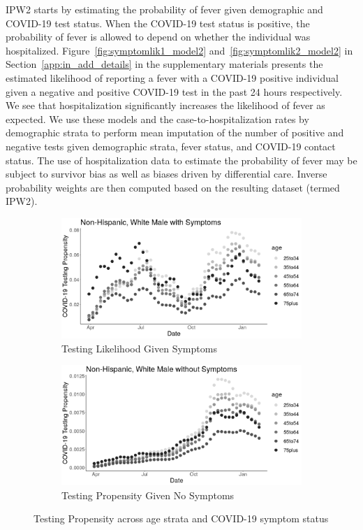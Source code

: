 \documentclass[11pt]{amsart}
\numberwithin{equation}{section}
\theoremstyle{plain}
\begin{document}
 IPW2 starts by estimating the probability of fever given demographic and COVID-19 test status.  When the COVID-19 test status is positive, the probability of fever is allowed to depend on whether the individual was hospitalized.  Figure~\ref{fig:symptomlik1_model2} and~\ref{fig:symptomlik2_model2} in Section~\ref{app:in_add_details} in the supplementary materials presents the estimated likelihood of reporting a fever with a COVID-19 positive individual given a negative and positive COVID-19 test in the past 24 hours respectively.  We see that hospitalization significantly increases the likelihood of fever as expected.  We use these models and the case-to-hospitalization rates by demographic strata to perform mean imputation of the number of positive and negative tests given demographic strata, fever status, and COVID-19 contact status. The use of hospitalization data to estimate the probability of fever may be subject to survivor bias as well as biases driven by differential care.  Inverse probability weights are then computed based on the resulting dataset (termed IPW2).


 \begin{figure}[!th]
 \centering
 \begin{subfigure}{.5\textwidth}
  \centering
  \includegraphics[width=.9\linewidth]{../figs/tvprop_alt_fig1_mainpaper.png}
  \caption{Testing Likelihood Given Symptoms}
  \label{fig:testinglik1_mainpaper}
 \end{subfigure}%
 \begin{subfigure}{.5\textwidth}
  \centering
 \includegraphics[width=.9\linewidth]{../figs/tvprop_alt_fig2_mainpaper.png}
  \caption{Testing Propensity Given No Symptoms}
  \label{fig:testinglik2_mainpaper}
 \end{subfigure}
 \caption{Testing Propensity across age strata and COVID-19 symptom status}
 \label{fig:testinglik_mainpaper}
 \end{figure}
\end{document}
